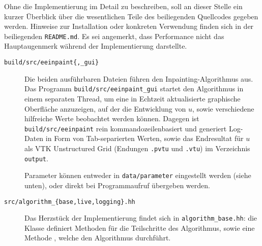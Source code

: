 \documentclass{mythesis}
\begin{document}
Ohne die Implementierung im Detail zu beschreiben, soll an dieser Stelle ein kurzer Überblick über die wesentlichen Teile des beiliegenden Quellcodes gegeben werden.
Hinweise zur Installation oder konkreten Verwendung finden sich in der beiliegenden \texttt{README.md}.
Es sei angemerkt, dass Performance nicht das Hauptaugenmerk während der Implementierung darstellte.

\begin{description}
    \item[\texttt{build/src/eeinpaint\{,_gui\}}]
	Die beiden ausführbaren Dateien führen den Inpainting-Algorithmus aus.
 	Das Programm \texttt{build/src/eeinpaint_gui} startet den Algorithmus in einem separaten Thread, um eine in Echtzeit aktualisierte graphische Oberfläche anzuzeigen, auf der die Entwicklung von $u$, sowie verschiedene hilfreiche Werte beobachtet werden können.
	Dagegen ist \texttt{build/src/eeinpaint} rein kommandozeilenbasiert und generiert Log-Daten in Form von Tab-separierten Werten, sowie das Endresultat für $u$ als VTK Unstructured Grid (Endungen \texttt{.pvtu} und \texttt{.vtu}) im Verzeichnis \texttt{output}.

	Parameter können entweder in \texttt{data/parameter} eingestellt werden (siehe unten), oder direkt bei Programmaufruf übergeben werden.
    \item[\texttt{src/algorithm_\{base,live,logging\}.hh}]
	Das Herzstück der Implementierung findet sich in \texttt{algorithm_base.hh}: die Klasse  definiert Methoden für die Teilschritte des Algorithmus, sowie eine Methode , welche den Algorithmus durchführt.


\end{description}
\end{document}
